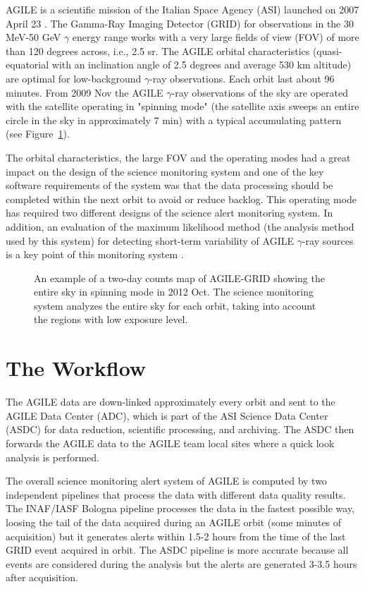 AGILE is a scientific mission of the Italian Space Agency (ASI) launched on 2007 April 23 \citep{Tavani:2009ht}. The Gamma-Ray Imaging Detector (GRID) for observations in the 30 MeV-50 GeV $\gamma$ energy range works with a very large fields of view (FOV) of more than 120 degrees across, i.e., 2.5 sr. The AGILE orbital characteristics (quasi-equatorial with an inclination angle of 2.5 degrees and average 530 km altitude) are optimal for low-background  $\gamma$-ray observations. Each orbit last about 96 minutes. From 2009 Nov the AGILE $\gamma$-ray observations of the sky are operated  with the satellite operating in "spinning mode" (the satellite axis sweeps an entire circle in the sky in approximately 7 min) with a typical accumulating pattern (see Figure~\ref{fig_fov}).            

The orbital characteristics, the large FOV and the operating modes had a great impact on the design of the science monitoring system and one of the key software requirements of the system was that the data processing should be completed within the next orbit to avoid or reduce backlog. This operating mode has required two different designs of the science alert monitoring system. In addition, an evaluation of the maximum likelihood method (the analysis method used by this system) for detecting short-term variability of AGILE $\gamma$-ray sources is a key point of this monitoring system \citep{Bulgarelli:2012ds}.
                   
\begin{figure}[t]
\caption{An example of a two-day counts map of AGILE-GRID showing the entire sky in spinning mode in 2012 Oct. The science monitoring system analyzes the entire sky for each orbit, taking into account the regions with low exposure level.} \label{fig_fov}
\end{figure}

\section{The Workflow}

The AGILE data are down-linked approximately every orbit and sent to the AGILE Data Center (ADC), which is part of the ASI Science Data Center (ASDC) for data reduction, scientific processing, and archiving. The ASDC then forwards the AGILE data to the AGILE team local sites where a quick look analysis is performed.

The overall science monitoring alert system of AGILE is computed by two independent pipelines that process the data with different data quality results. The INAF/IASF Bologna pipeline processes the data in the fastest possible way, loosing the tail of the data acquired during an AGILE orbit (some minutes of acquisition) but it generates alerts within 1.5-2 hours from the time of the last GRID event acquired in orbit. The ASDC pipeline is more accurate because all events are considered during the analysis but the alerts are generated 3-3.5 hours after acquisition.

